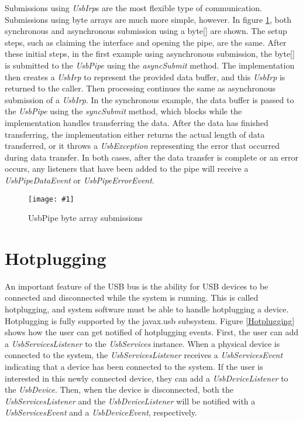 \documentclass{article}
\newcommand{\myclass}[1]{\emph{#1}}
\newcommand{\myinterface}[1]{\emph{#1}}
\newcommand{\mymethod}[1]{\emph{#1}}
\newcommand{\mysectionend}[0]{\vfill\pagebreak[1]}
\newcommand{\myfigure}[3]{\begin{figure}[htbp]\centering\texttt{[image: \#1]}\caption{#2}\label{#3}\end{figure}}
\begin{document}
Submissions using \myinterface{UsbIrp}s are the most flexible type of communication.
Submissions using byte arrays are much more simple, however.  In
figure \ref{UsbPipeByteArray}, both synchronous and asynchronous submission
using a byte[] are shown.  The setup steps, such as claiming the interface
and opening the pipe, are the same.  After these initial steps, in the
first example using asynchronous submission, the byte[] is submitted to
the \myinterface{UsbPipe} using the \mymethod{asyncSubmit} method.  The implementation then
creates a \myinterface{UsbIrp} to represent the provided data buffer, and this \myinterface{UsbIrp} is
returned to the caller.  Then processing continues the same as asynchronous
submission of a \myinterface{UsbIrp}.  In the synchronous example, the data buffer is passed
to the \myinterface{UsbPipe} using the \mymethod{syncSubmit} method, which blocks while the
implementation handles transferring the data.  After the data has finished
transferring, the implementation either returns the actual length of data
transferred, or it throws a \myclass{UsbException} representing the error that
occurred during data transfer.  In both cases, after the data transfer is complete
or an error occurs, any listeners that have been added to the pipe will receive
a \myclass{UsbPipeDataEvent} or \myclass{UsbPipeErrorEvent}.

\myfigure{figs/UsbPipeByteArray}{UsbPipe byte array submissions}{UsbPipeByteArray}

\mysectionend

%

\section{Hotplugging}

An important feature of the USB bus is the ability for USB devices to
be connected and disconnected while the system is running.  This is called
hotplugging, and system software must be able to handle hotplugging a device.
Hotplugging is fully supported by the javax.usb subsystem.  Figure
\ref{Hotplugging} shows how the user can get notified of hotplugging events.
First, the user can add a \myinterface{UsbServicesListener} to the \myinterface{UsbServices} instance.
When a physical device is connected to the system, the \myinterface{UsbServicesListener}
receives a \myclass{UsbServicesEvent} indicating that a device has been connected to the
system.  If the user is interested in this newly connected device, they can
add a \myinterface{UsbDeviceListener} to the \myinterface{UsbDevice}.  Then, when the device is
disconnected, both the \myinterface{UsbServicesListener} and the \myinterface{UsbDeviceListener} will be
notified with a \myclass{UsbServicesEvent} and a \myclass{UsbDeviceEvent}, respectively.
\end{document}
